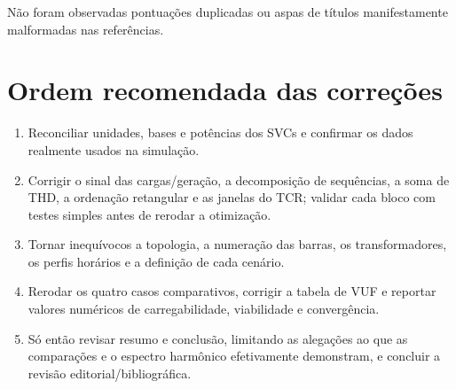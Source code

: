 \documentclass[11pt,a4paper]{article}
\begin{document}
Não foram observadas pontuações duplicadas ou aspas de títulos manifestamente
malformadas nas referências.

\section*{Ordem recomendada das correções}

\begin{enumerate}
  \item Reconciliar unidades, bases e potências dos SVCs e confirmar os dados
  realmente usados na simulação.
  \item Corrigir o sinal das cargas/geração, a decomposição de sequências, a
  soma de THD, a ordenação retangular e as janelas do TCR; validar cada bloco
  com testes simples antes de rerodar a otimização.
  \item Tornar inequívocos a topologia, a numeração das barras, os
  transformadores, os perfis horários e a definição de cada cenário.
  \item Rerodar os quatro casos comparativos, corrigir a tabela de VUF e
  reportar valores numéricos de carregabilidade, viabilidade e convergência.
  \item Só então revisar resumo e conclusão, limitando as alegações ao que as
  comparações e o espectro harmônico efetivamente demonstram, e concluir a
  revisão editorial/bibliográfica.
\end{enumerate}
\end{document}
